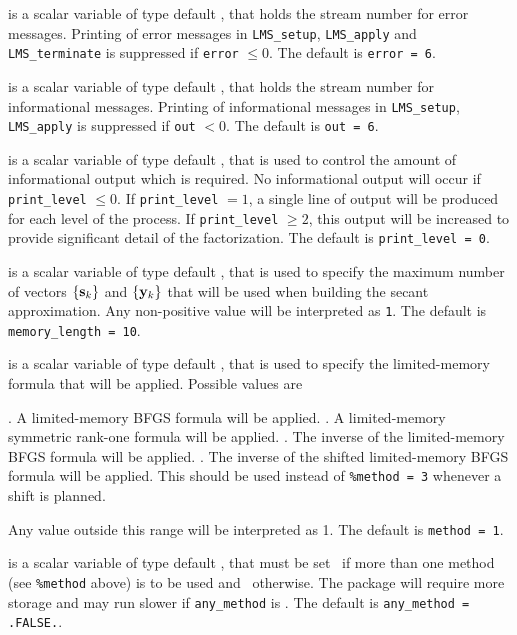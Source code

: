 \documentclass{galahad}
\newcommand{\packagename}{LMS}
\begin{document}
\begin{description}

 is a scalar variable of type default \integer, that holds the
stream number for error messages. Printing of error messages in
{\tt \packagename\_setup}, {\tt \packagename\_apply}
and {\tt \packagename\_terminate}
is suppressed if {\tt error} $\leq 0$.
The default is {\tt error = 6}.

 is a scalar variable of type default \integer, that holds the
stream number for informational messages. Printing of informational messages in
{\tt \packagename\_setup}, {\tt \packagename\_apply}
is suppressed if {\tt out} $< 0$.
The default is {\tt out = 6}.

 is a scalar variable of type default \integer, that is used
to control the amount of informational output which is required. No
informational output will occur if {\tt print\_level} $\leq 0$. If
{\tt print\_level} $= 1$, a single line of output will be produced for each
level of the process. If {\tt print\_level} $\geq 2$, this output will be
increased to provide significant detail of the factorization.
The default is {\tt print\_level = 0}.

 is a scalar variable of type default \integer, that is used
to specify the maximum number of vectors  $\{{\mathbf{s}}_k\}$ and $\{{\mathbf{y}}_k\}$
that will be used when building the secant approximation.
Any non-positive value will be interpreted as {\tt 1}.
The default is {\tt memory\_length = 10}.

 is a scalar variable of type default \integer, that is used
to specify the limited-memory formula that will be applied. Possible
values are
\begin{description}
. A limited-memory BFGS formula will be applied.
. A limited-memory symmetric rank-one formula will be applied.
. The inverse of the limited-memory BFGS formula will be applied.
. The inverse of the shifted limited-memory BFGS formula will be applied.
This should be used instead of {\tt \%method = 3} whenever a shift is
planned.
\end{description}
Any value outside this range will be interpreted as {1}.
The default is {\tt method = 1}.

 is a scalar variable of type default \logical,
that must be set \true\ if more than one method (see {\tt \%method} above)
is to be used and  \false\ otherwise. The package will require more
storage and may run slower if {\tt any\_method} is \true.
The default is {\tt any\_method = .FALSE.}.


\end{description}
\end{document}
